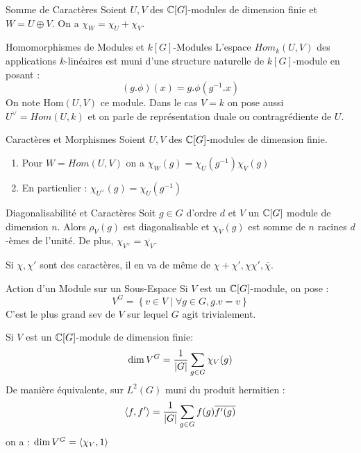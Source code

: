 \documentclass{cours}
\begin{document}
\begin{propositionfr}{Somme de Caractères}{}
    Soient $U, V$ des $\mathbb{C}[G]$-modules de dimension finie et $W = U \oplus V$. On a $\chi_{W} = \chi_{U} + \chi_{V}$.
\end{propositionfr}

\begin{définition}{Homomorphismes de Modules et $k[G]$-Modules}{}
    L'espace $Hom_{k}(U, V)$ des applications $k$-linéaires est muni d'une structure naturelle de $k[G]$-module en posant :
    \[
        \left(g.\phi\right)(x) = g.\phi(g^{-1}.x)
    \]
    On note Hom$(U, V)$ ce module. Dans le cas $V = k$ on pose aussi $U^{\lor} = Hom(U, k)$ et on parle de représentation duale ou contragrédiente de $U$.
\end{définition}

\begin{propositionfr}{Caractères et Morphismes}{}
    Soient $U, V$ des $\mathbb{C}[G]$-modules de dimension finie.
    \begin{enumerate}
        \item Pour $W = Hom(U, V)$ on a $\chi_{W}(g) = \chi_{U}(g^{-1})\chi_{V}(g)$
        \item En particulier : $\chi_{U^{\lor}}(g) = \chi_{U}(g^{-1})$
    \end{enumerate}
\end{propositionfr}
\begin{propositionfr}{Diagonalisabilité et Caractères}{}
    Soit $g \in G$ d'ordre $d$ et $V$ un $\mathbb{C}[G]$ module de dimension $n$. Alors $\rho_{V}(g)$ est diagonalisable et $\chi_{V}(g)$ est somme de $n$ racines $d$-èmes de l'unité. De plus, $\chi_{V^{\lor}} = \overline{\chi_{V}}$.
\end{propositionfr}

\begin{corollaire}{}{}
    Si $\chi, \chi'$ sont des caractères, il en va de même de $\chi + \chi', \chi\chi', \overline{\chi}$.
\end{corollaire}

\begin{définition}{Action d'un Module sur un Sous-Espace}{}
    Si $V$ est un $\mathbb{C}[G]$-module, on pose :
    \[
        V^{G} = \left\{v\in V \mid  \forall g \in G, g.v = v\right\}
    \]
    C'est le plus grand sev de $V$ sur lequel $G$ agit trivialement.
\end{définition}

\begin{lemma}
    Si $V$ est un $\mathbb{C}[G]$-module de dimension finie:
    \[
        \dim V^{G} = \frac{1}{\left|G\right|} \sum_{g \in G}\chi_{V}(g)
    \]
    De manière équivalente, sur $L^{2}(G)$ muni du produit hermitien :
    \[
        \left\langle f, f' \right\rangle = \frac{1}{\left|G\right|}\sum_{g \in G}f(g)\overline{f'(g)}
    \]
    on a : $\dim V^{G} = \left\langle \chi_{V}, 1 \right\rangle$
\end{lemma}
\end{document}

